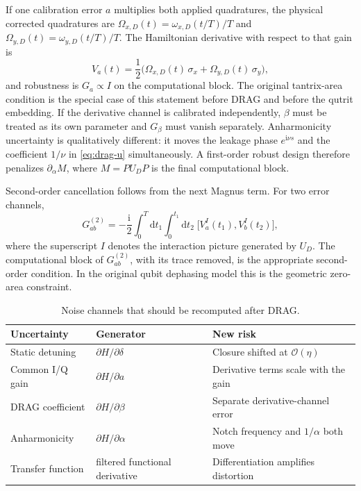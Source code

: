 \documentclass[11pt,a4paper]{article}
\theoremstyle{definition}
\newcommand{\dd}{\mathrm{d}}
\newcommand{\ii}{\mathrm{i}}
\newcommand{\order}{\mathcal{O}}
\begin{document}
If one calibration error \(a\) multiplies both applied quadratures, the
physical corrected quadratures are \(\Omega_{x,D}(t)=\omega_{x,D}(t/T)/T\) and
\(\Omega_{y,D}(t)=\omega_{y,D}(t/T)/T\).  The Hamiltonian derivative with
respect to that gain is
\begin{equation}
  V_a(t)=\frac12\bigl(\Omega_{x,D}(t)\,\sigma_x+\Omega_{y,D}(t)\,\sigma_y\bigr),
\end{equation}
and robustness is \(G_a\propto I\) on the computational block.  The original
tantrix-area condition is the special case of this statement before DRAG and
before the qutrit embedding.  If the derivative channel is calibrated
independently, \(\beta\) must be treated as its own parameter and \(G_\beta\)
must vanish separately.  Anharmonicity uncertainty is qualitatively different:
it moves the leakage phase \(e^{\ii\nu s}\) and the coefficient \(1/\nu\) in
\eqref{eq:drag-u} simultaneously.  A first-order robust design therefore
penalizes \(\partial_\alpha M\), where \(M=PU_DP\) is the final computational
block.

Second-order cancellation follows from the next Magnus term.  For two error
channels,
\begin{equation}
  G_{ab}^{(2)}=-\frac{\ii}{2}\int_0^T\dd t_1\int_0^{t_1}\dd t_2\;
  \bigl[V_a^I(t_1),V_b^I(t_2)\bigr],
\end{equation}
where the superscript \(I\) denotes the interaction picture generated by
\(U_D\).  The computational block of \(G_{ab}^{(2)}\), with its trace removed,
is the appropriate second-order condition.  In the original qubit dephasing
model this is the geometric zero-area constraint.

\begin{table}[ht]
\centering
\caption{Noise channels that should be recomputed after DRAG.}
\label{tab:channels}
\begin{tabular}{@{}lll@{}}
\toprule
Uncertainty & Generator & New risk \\
\midrule
Static detuning & \(\partial H/\partial\delta\) & Closure shifted at \(\order(\eta)\) \\
Common I/Q gain & \(\partial H/\partial a\) & Derivative terms scale with the gain \\
DRAG coefficient & \(\partial H/\partial\beta\) & Separate derivative-channel error \\
Anharmonicity & \(\partial H/\partial\alpha\) & Notch frequency and \(1/\alpha\) both move \\
Transfer function & filtered functional derivative & Differentiation amplifies distortion \\
\bottomrule
\end{tabular}
\end{table}
\end{document}
